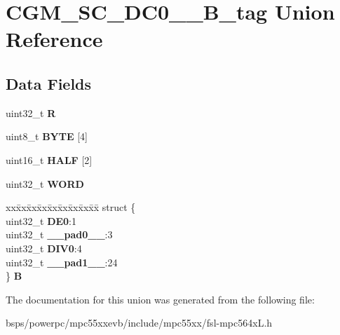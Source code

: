 \hypertarget{unionCGM__SC__DC0__3__32B__tag}{}\section{C\+G\+M\+\_\+\+S\+C\+\_\+\+D\+C0\+\_\+\_\+B\+\_\+tag Union Reference}
\label{unionCGM__SC__DC0__3__32B__tag}
\subsection*{Data Fields}
\begin{DoxyCompactItemize}
\item 
\mbox{\label{unionCGM__SC__DC0__3__32B__tag_a2e861b9c710e85c7bd4ee1741353bd1f}} 
uint32\+\_\+t {\bfseries R}
\item 
\mbox{\label{unionCGM__SC__DC0__3__32B__tag_a0e48d0414d67a6542f729fc850b2e1ee}} 
uint8\+\_\+t {\bfseries B\+Y\+TE} \mbox{[}4\mbox{]}
\item 
\mbox{\label{unionCGM__SC__DC0__3__32B__tag_a2290d73eaa7532b2219f2b436aa4453d}} 
uint16\+\_\+t {\bfseries H\+A\+LF} \mbox{[}2\mbox{]}
\item 
\mbox{\label{unionCGM__SC__DC0__3__32B__tag_a3d5c530e097505a786945dc1645b693a}} 
uint32\+\_\+t {\bfseries W\+O\+RD}
\item 
\mbox{\label{unionCGM__SC__DC0__3__32B__tag_ad7b6d3d6249d90ff96da0848bdc70774}} 
\begin{tabbing}
xx\=xx\=xx\=xx\=xx\=xx\=xx\=xx\=xx\=\kill
struct \{\\
\>uint32\_t {\bfseries DE0}:1\\
\>uint32\_t {\bfseries \_\_pad0\_\_}:3\\
\>uint32\_t {\bfseries DIV0}:4\\
\>uint32\_t {\bfseries \_\_pad1\_\_}:24\\
\} {\bfseries B}\\

\end{tabbing}\end{DoxyCompactItemize}


The documentation for this union was generated from the following file\+:\begin{DoxyCompactItemize}
\item 
bsps/powerpc/mpc55xxevb/include/mpc55xx/fsl-\/mpc564x\+L.\+h\end{DoxyCompactItemize}
